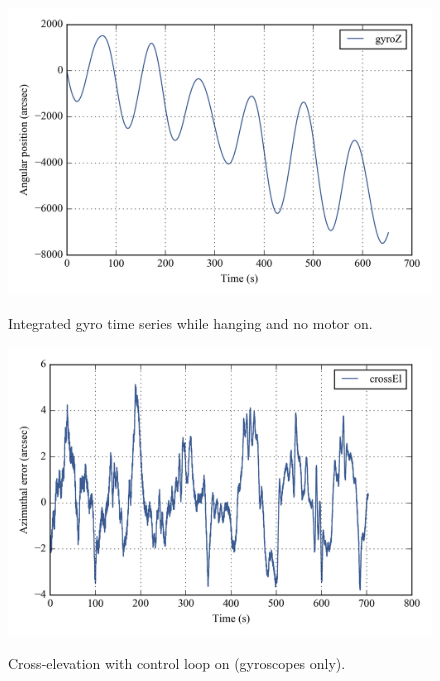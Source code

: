 \begin{figure}[!ht]
\begin{center}
\includegraphics{Figures/integral_lifted_gyroZ.png}
\label{fig:intgralgyroZ400}
\vspace{-0.5cm}
\caption[Integrated gyro time series while hanging]{Integrated gyro time series while hanging and no motor on.}
\end{center}
\end{figure}
\begin{figure}[!h]
\begin{center}
\includegraphics[width=\textwidth]{Figures/simplePlot_crossEl.png}
\label{fig:crossEl400}
\vspace{-0.5cm}
\caption[Cross-elevation with control loop on]{Cross-elevation with control loop on (gyroscopes only).}
\end{center}
\end{figure}




